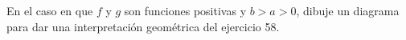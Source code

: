 \item En el caso en que $f$ y $g$ son funciones positivas y $b > a > 0$, dibuje un diagrama para dar una interpretación geométrica del ejercicio 58.
